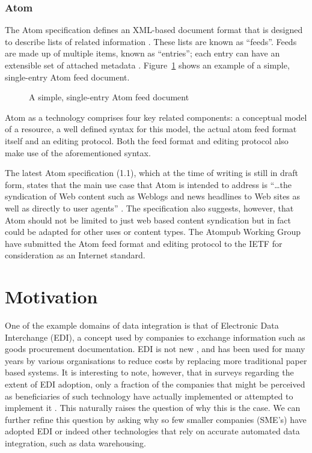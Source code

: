 \documentclass{CRPITStyle}
\begin{document}
\subsubsection{Atom}
\label{sec-atom-detail}

The Atom specification defines an XML-based document format that is
designed to describe lists of related information
\cite{Nott-M-2005-Atom}. These lists are known as ``feeds''. Feeds are
made up of multiple items, known as ``entries''; each entry can have an
extensible set of attached metadata \cite{Nott-M-2005-Atom}.
Figure~\ref{fig-atom-example} shows an example of a simple, single-entry
Atom feed document.


\begin{figure}
	\caption{A simple, single-entry Atom feed document \protect\cite{Nott-M-2005-Atom}}
	\label{fig-atom-example}
\end{figure}


Atom as a technology comprises four key related components: a conceptual
model of a resource, a well defined syntax for this model, the actual
atom feed format itself and an editing protocol. Both the feed format
and editing protocol also make use of the aforementioned syntax.

The latest Atom specification (1.1), which at the time of writing is
still in draft form, states that the main use case that Atom is intended
to address is ``\ldots{}the syndication of Web content such as Weblogs
and news headlines to Web sites as well as directly to user agents''
\cite{Nott-M-2005-Atom}. The specification also suggests, however, that
Atom should not be limited to just web based content syndication but in
fact could be adapted for other uses or content types. The Atompub
Working Group have submitted the Atom feed format and editing protocol
to the IETF for consideration as an Internet standard.


\section{Motivation}
\label{sec-motivation}

One of the example domains of data integration is that of Electronic
Data Interchange (EDI), a concept used by companies to exchange
information such as goods procurement documentation. EDI is not new
\cite{Beck-R-2002-Bled,Medj-B-2003-VLDB}, and has been used for many
years by various organisations to reduce costs by replacing more
traditional paper based systems. It is interesting to note, however,
that in surveys regarding the extent of EDI adoption, only a fraction
of the companies that might be perceived as beneficiaries of such
technology have actually implemented or attempted to implement it
\cite{Beck-R-2002-Bled,vaHe-E-1999-EDI}. This naturally raises the
question of why this is the case. We can further refine this question by
asking why so few smaller companies (SME's) have adopted EDI or indeed
other technologies that rely on accurate automated data integration,
such as data warehousing.
\end{document}
